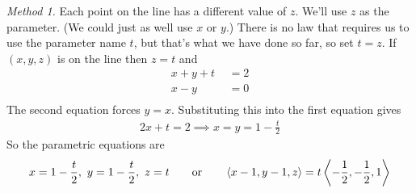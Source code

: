 \begin{eg}
\begin{efig}
\begin{center}
      \end{center}
      \end{efig}

\noindent\emph{Method 1.} Each point on the line has a different value of
$z$. We'll use $z$ as the parameter. (We could just as well use $x$ or
$y$.) There is no law that requires us to use the parameter name $t$,
but that's what we have done so far, so set $t=z$. If $(x,y,z)$ is on 
the line then $z=t$ and
\begin{align*}
x+y+t&=2 \\
x-y\phantom{\ \,+t}&=0  \\
\end{align*}
The second equation forces $y=x$. Substituting this into the first equation
gives
\begin{align*}
2x+t=2 \implies x=y=1-\tfrac{t}{2}
\end{align*}
So the parametric equations are
\begin{align*}
x=1-\frac{t}{2},\ 
y=1-\frac{t}{2},\ 
z=t\qquad\text{or}\qquad
\llt x-1,y-1,z\rgt  = t\llt -\frac{1}{2}, -\frac{1}{2}, 1\rgt 
\end{align*}


\end{eg}
